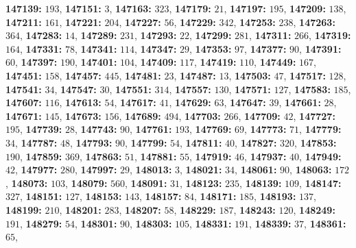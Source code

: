 \textsf{\bfseries 147139:} $193$, \textsf{\bfseries 147151:} $3$, \textsf{\bfseries 147163:} $323$, \textsf{\bfseries 147179:} $21$, \textsf{\bfseries 147197:} $195$, \textsf{\bfseries 147209:} $138$, \textsf{\bfseries 147211:} $161$, \textsf{\bfseries 147221:} $204$, \textsf{\bfseries 147227:} $56$, \textsf{\bfseries 147229:} $342$, \textsf{\bfseries 147253:} $238$, \textsf{\bfseries 147263:} $364$, \textsf{\bfseries 147283:} $14$, \textsf{\bfseries 147289:} $231$, \textsf{\bfseries 147293:} $22$, \textsf{\bfseries 147299:} $281$, \textsf{\bfseries 147311:} $266$, \textsf{\bfseries 147319:} $164$, \textsf{\bfseries 147331:} $78$, \textsf{\bfseries 147341:} $114$, \textsf{\bfseries 147347:} $29$, \textsf{\bfseries 147353:} $97$, \textsf{\bfseries 147377:} $90$, \textsf{\bfseries 147391:} $60$, \textsf{\bfseries 147397:} $190$, \textsf{\bfseries 147401:} $104$, \textsf{\bfseries 147409:} $117$, \textsf{\bfseries 147419:} $110$, \textsf{\bfseries 147449:} $167$, \textsf{\bfseries 147451:} $158$, \textsf{\bfseries 147457:} $445$, \textsf{\bfseries 147481:} $23$, \textsf{\bfseries 147487:} $13$, \textsf{\bfseries 147503:} $47$, \textsf{\bfseries 147517:} $128$, \textsf{\bfseries 147541:} $34$, \textsf{\bfseries 147547:} $30$, \textsf{\bfseries 147551:} $314$, \textsf{\bfseries 147557:} $130$, \textsf{\bfseries 147571:} $127$, \textsf{\bfseries 147583:} $185$, \textsf{\bfseries 147607:} $116$, \textsf{\bfseries 147613:} $54$, \textsf{\bfseries 147617:} $41$, \textsf{\bfseries 147629:} $63$, \textsf{\bfseries 147647:} $39$, \textsf{\bfseries 147661:} $28$, \textsf{\bfseries 147671:} $145$, \textsf{\bfseries 147673:} $156$, \textsf{\bfseries 147689:} $494$, \textsf{\bfseries 147703:} $266$, \textsf{\bfseries 147709:} $42$, \textsf{\bfseries 147727:} $195$, \textsf{\bfseries 147739:} $28$, \textsf{\bfseries 147743:} $90$, \textsf{\bfseries 147761:} $193$, \textsf{\bfseries 147769:} $69$, \textsf{\bfseries 147773:} $71$, \textsf{\bfseries 147779:} $34$, \textsf{\bfseries 147787:} $48$, \textsf{\bfseries 147793:} $90$, \textsf{\bfseries 147799:} $54$, \textsf{\bfseries 147811:} $40$, \textsf{\bfseries 147827:} $320$, \textsf{\bfseries 147853:} $190$, \textsf{\bfseries 147859:} $369$, \textsf{\bfseries 147863:} $51$, \textsf{\bfseries 147881:} $55$, \textsf{\bfseries 147919:} $46$, \textsf{\bfseries 147937:} $40$, \textsf{\bfseries 147949:} $42$, \textsf{\bfseries 147977:} $280$, \textsf{\bfseries 147997:} $29$, \textsf{\bfseries 148013:} $3$, \textsf{\bfseries 148021:} $34$, \textsf{\bfseries 148061:} $90$, \textsf{\bfseries 148063:} $172$, \textsf{\bfseries 148073:} $103$, \textsf{\bfseries 148079:} $560$, \textsf{\bfseries 148091:} $31$, \textsf{\bfseries 148123:} $235$, \textsf{\bfseries 148139:} $109$, \textsf{\bfseries 148147:} $327$, \textsf{\bfseries 148151:} $127$, \textsf{\bfseries 148153:} $143$, \textsf{\bfseries 148157:} $84$, \textsf{\bfseries 148171:} $185$, \textsf{\bfseries 148193:} $137$, \textsf{\bfseries 148199:} $210$, \textsf{\bfseries 148201:} $283$, \textsf{\bfseries 148207:} $58$, \textsf{\bfseries 148229:} $187$, \textsf{\bfseries 148243:} $120$, \textsf{\bfseries 148249:} $191$, \textsf{\bfseries 148279:} $54$, \textsf{\bfseries 148301:} $90$, \textsf{\bfseries 148303:} $105$, \textsf{\bfseries 148331:} $191$, \textsf{\bfseries 148339:} $37$, \textsf{\bfseries 148361:} $65$, 
